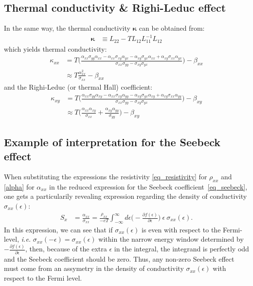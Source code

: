\documentclass[notitlepage,11pt,nofootinbib]{revtex4-1}
\begin{document}
\subsection{Thermal conductivity \& Righi-Leduc effect}
In the same way, the thermal conductivity $\boldsymbol{\kappa}$ can be obtained from:
\begin{align}
\boldsymbol{\kappa} &\equiv L_{22} - TL_{12}L_{11}^{-1}L_{12}
\end{align}
which yields thermal conductivity:
\begin{align}
\kappa_{xx} 
&=
T\Big(\frac{
\alpha_{xx}\sigma_{yy}\alpha_{xx} -
\alpha_{xx}\sigma_{xy}\alpha_{yx} -
\alpha_{xy}\sigma_{yx}\alpha_{xx} +
\alpha_{xy}\sigma_{xx}\alpha_{yx}
}{\sigma_{xx}\sigma_{yy}-\sigma_{xy}\sigma_{yx}}
\Big) - \beta_{xx}
\\ &
\approx
T
\frac{
\alpha_{xx}^2
}{\sigma_{xx}}
- \beta_{xx}
\end{align}
and the Righi-Leduc (or thermal Hall) coefficient:
\begin{align}
\kappa_{xy} 
&=
T\Big(\frac{
\alpha_{xx}\sigma_{yy}\alpha_{xy} -
\alpha_{xx}\sigma_{xy}\alpha_{yy} -
\alpha_{xy}\sigma_{yx}\alpha_{xy} +
\alpha_{xy}\sigma_{xx}\alpha_{yy}
}{\sigma_{xx}\sigma_{yy}-\sigma_{xy}\sigma_{yx}}
\Big) - \beta_{xy}
\\ &
\approx
T\Big( \frac{
\alpha_{xx}\alpha_{xy}
}{\sigma_{xx}}
+
\frac{
\alpha_{xy}\alpha_{yy}
}{\sigma_{yy}}
\Big) - \beta_{xy}
\end{align}

\subsection{Example of interpretation for the Seebeck effect}
When substituting the expressions the resistivity \eqref{eq_resistivity} for $\rho_{xx}$ and \eqref{alpha} for $\alpha_{xx}$ in the reduced expression for the Seebeck coefficient~\eqref{eq_seebeck}, one gets a particularily revealing expression regarding the density of conductivity $\sigma_{xx}(\epsilon)$:
\begin{align}
S_x 
&=
\frac{\alpha_{xx}}{\sigma_{xx}}
=
\frac{\rho_{xx}}{-eT}
\int_{-\infty}^{\infty}d\epsilon
\Big(-\frac{\partial f(\epsilon)}{\partial \epsilon}\Big)
\ \epsilon\ 
\sigma_{xx}(\epsilon).
\label{eq_seebeck_explicit}
\end{align}
In this expression, we can see that if $\sigma_{xx}(\epsilon)$ is even with respect to the Fermi-level, \emph{i.e.} $\sigma_{xx}(-\epsilon) = \sigma_{xx}(\epsilon)$ within the narrow energy window determined by $-\frac{\partial f(\epsilon)}{\partial \epsilon}$, then, because of the extra $\epsilon$ in the integral, the integrand is perfectly odd and the Seebeck coefficient should be zero. Thus, any non-zero Seebeck effect must come from an assymetry in the density of conductivity $\sigma_{xx}(\epsilon)$ with respect to the Fermi level.
\end{document}
